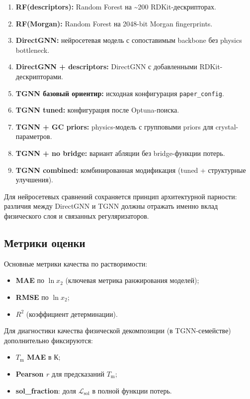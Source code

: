 \documentclass[11pt]{article}
\begin{document}
\begin{enumerate}
  \item \textbf{RF(descriptors):} Random Forest на \textasciitilde200 RDKit-дескрипторах.
  \item \textbf{RF(Morgan):} Random Forest на 2048-bit Morgan fingerprints.
  \item \textbf{DirectGNN:} нейросетевая модель с сопоставимым backbone без physics bottleneck.
  \item \textbf{DirectGNN + descriptors:} DirectGNN с добавленными RDKit-дескрипторами.
  \item \textbf{TGNN базовый ориентир:} исходная конфигурация \texttt{paper\_config}.
  \item \textbf{TGNN tuned:} конфигурация после Optuna-поиска.
  \item \textbf{TGNN + GC priors:} physics-модель с групповыми priors для crystal-параметров.
  \item \textbf{TGNN + no bridge:} вариант абляции без bridge-функции потерь.
  \item \textbf{TGNN combined:} комбинированная модификация (tuned + структурные улучшения).
\end{enumerate}

Для нейросетевых сравнений сохраняется принцип архитектурной парности: различия между DirectGNN и TGNN должны отражать именно вклад физического слоя и связанных регуляризаторов.

\subsection{Метрики оценки}

Основные метрики качества по растворимости:
\begin{itemize}
  \item \textbf{MAE} по $\ln x_2$ (ключевая метрика ранжирования моделей);
  \item \textbf{RMSE} по $\ln x_2$;
  \item \textbf{$R^2$} (коэффициент детерминации).
\end{itemize}

Для диагностики качества физической декомпозиции (в TGNN-семействе) дополнительно фиксируются:
\begin{itemize}
  \item \textbf{$T_{\mathrm{m}}$ MAE} в К;
  \item \textbf{Pearson $r$} для предсказаний $T_{\mathrm{m}}$;
  \item \textbf{sol\_fraction}: доля $\mathcal{L}_{\mathrm{sol}}$ в полной функции потерь.
\end{itemize}
\end{document}
